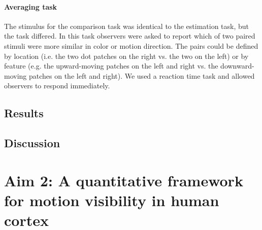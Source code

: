 \documentclass{report}
\begin{document}
\subsubsection{Averaging task}

The stimulus for the comparison task was identical to the estimation task, but the task differed. In this task observers were asked to report which of two paired stimuli were more similar in color or motion direction. The pairs could be defined by location (i.e. the two dot patches on the right vs. the two on the left) or by feature (e.g. the upward-moving patches on the left and right vs. the downward-moving patches on the left and right). We used a reaction time task and allowed observers to respond immediately. 

\section{Results}



\section{Discussion}

\chapter[A framework for motion visibility]{Aim 2: A quantitative framework for motion visibility in human cortex}
\end{document}

